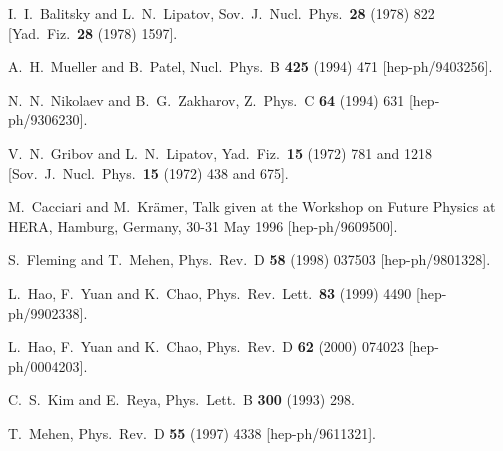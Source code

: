\begin{thebibliography}{999}
I.~I.~Balitsky and L.~N.~Lipatov,
Sov.\ J.\ Nucl.\ Phys.\  {\bf 28} (1978) 822
[Yad.\ Fiz.\  {\bf 28} (1978) 1597].

A.~H.~Mueller and B.~Patel,
Nucl.\ Phys.\ B {\bf 425} (1994) 471 
[hep-ph/9403256].

N.~N.~Nikolaev and B.~G.~Zakharov,
Z.\ Phys.\ C {\bf 64} (1994) 631 
[hep-ph/9306230].

V.~N.~Gribov and L.~N.~Lipatov,
Yad.\ Fiz.\  {\bf 15} (1972) 781 and 1218
[Sov.\ J.\ Nucl.\ Phys.\  {\bf 15} (1972) 438 and 675].


M.~Cacciari and M.~Kr\"amer, Talk given at the Workshop on Future
Physics at HERA, Hamburg, Germany, 30-31 May 1996
[hep-ph/9609500].

S.~Fleming and T.~Mehen,
Phys.\ Rev.\ D {\bf 58} (1998) 037503
[hep-ph/9801328].
 
L.~Hao, F.~Yuan and K.~Chao,
Phys.\ Rev.\ Lett.\  {\bf 83} (1999) 4490
[hep-ph/9902338].
 
L.~Hao, F.~Yuan and K.~Chao,
Phys.\ Rev.\ D {\bf 62} (2000) 074023
[hep-ph/0004203].
 
C.~S.~Kim and E.~Reya,
Phys.\ Lett.\ B {\bf 300} (1993) 298.
 
T.~Mehen,
Phys.\ Rev.\ D {\bf 55} (1997) 4338
[hep-ph/9611321].


\end{thebibliography}
